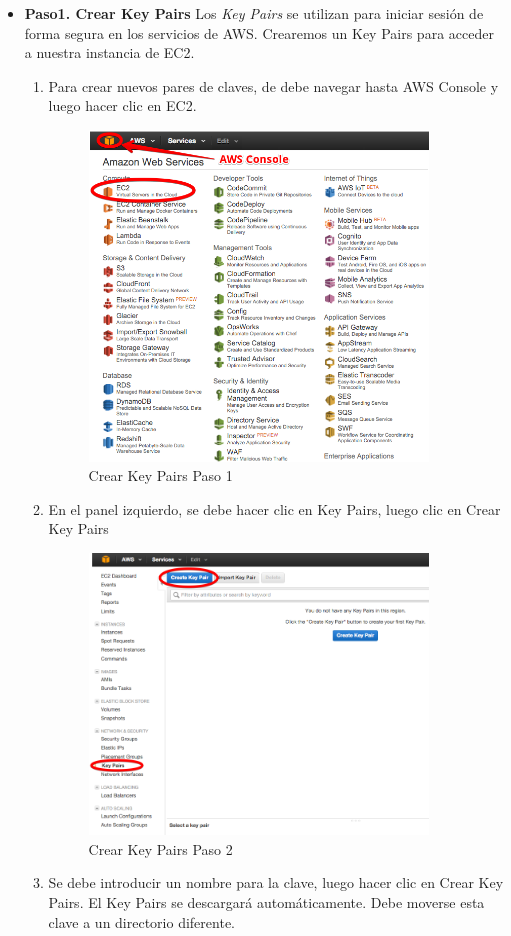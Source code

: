 \begin{itemize}
    \item \textbf{Paso1. Crear Key Pairs} Los \textit{Key Pairs} se utilizan para iniciar sesión de forma segura en los servicios de AWS. Crearemos un Key Pairs para acceder a nuestra instancia de EC2.
\begin{enumerate}
    \item Para crear nuevos pares de claves, de debe navegar hasta AWS Console y luego hacer clic en EC2.
    \begin{figure}[!h]
    \centering
    \includegraphics[width=90mm]{img/despliegue/paso1_1.png}
    \caption{Crear Key Pairs Paso 1}
    \end{figure}
    \item En el panel izquierdo, se debe hacer clic en Key Pairs, luego clic en Crear Key Pairs
     \begin{figure}[!h]
    \centering
    \includegraphics[width=90mm]{img/despliegue/paso1_2.png}
    \caption{Crear Key Pairs Paso 2}
    \end{figure}
    \item Se debe introducir un nombre para la clave, luego hacer clic en Crear Key Pairs. El Key Pairs se descargará automáticamente. Debe moverse esta clave a un directorio diferente.


\end{enumerate}
\end{itemize}
